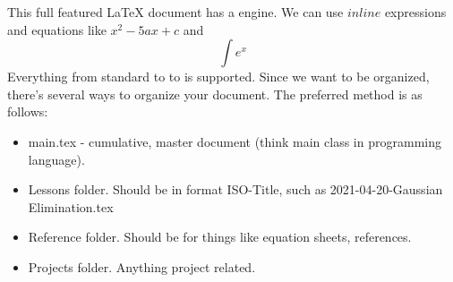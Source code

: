 \markdownRendererUlBegin
\markdownRendererUlItem This full featured LaTeX document has a  engine.\markdownRendererUlItemEnd 
\markdownRendererUlItem We can use $inline$ expressions and equations like $x^2-5ax+c$ and $$\int e^x$$\markdownRendererUlItemEnd 
\markdownRendererUlEnd \markdownRendererInterblockSeparator
{}Everything from standard  to  to  is supported.\markdownRendererInterblockSeparator
{}\markdownRendererInterblockSeparator
{}Since we want to be organized, there's several ways to organize your document. The preferred method is as follows:\markdownRendererInterblockSeparator
{}\markdownRendererInterblockSeparator
{}\begin{itemize} \item main.tex - cumulative, master document (think main class in programming language). \item Lessons folder. Should be in format ISO-Title, such as 2021-04-20-Gaussian Elimination.tex \item Reference folder. Should be for things like equation sheets, references. \item Projects folder. Anything project related. \end{itemize}\relax
